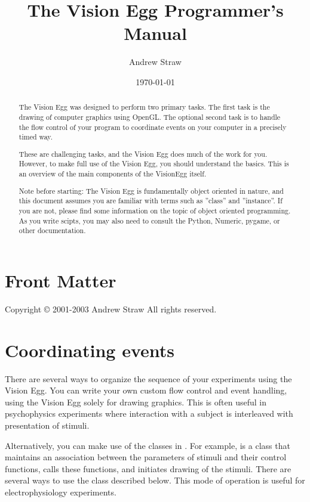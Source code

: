 \documentclass{manual}
\title{The Vision Egg Programmer's Manual}
\author{Andrew Straw}
\date{\today}			%
\begin{document}
\maketitle

\ifhtml
\chapter*{Front Matter\label{front}}
\fi

Copyright \copyright{} 2001-2003 Andrew Straw
All rights reserved.

\begin{abstract}

\noindent
The Vision Egg was designed to perform two primary tasks.  The first
task is the drawing of computer graphics using OpenGL.  The optional
second task is to handle the flow control of your program to
coordinate events on your computer in a precisely timed way.

These are challenging tasks, and the Vision Egg does much of the work
for you. However, to make full use of the Vision Egg, you should
understand the basics.  This is an overview of the main components of
the VisionEgg itself.

Note before starting: The Vision Egg is fundamentally object oriented
in nature, and this document assumes you are familiar with terms such
as ''class'' and ''instance''.  If you are not, please find some
information on the topic of object oriented programming.  As you write
scipts, you may also need to consult the Python, Numeric, pygame, or
other documentation.
\end{abstract}

\tableofcontents

\chapter{Coordinating events \label{coordinating events}}

There are several ways to organize the sequence of your experiments
using the Vision Egg.  You can write your own custom flow control and
event handling, using the Vision Egg solely for drawing graphics.
This is often useful in psychophysics experiments where interaction
with a subject is interleaved with presentation of stimuli.

Alternatively, you can make use of the classes in
.  For example,  is a class
that maintains an association between the parameters of stimuli and
their control functions, calls these functions, and initiates drawing
of the stimuli.  There are several ways to use the
 class described below.  This mode of operation is
useful for electrophysiology experiments.
\end{document}
